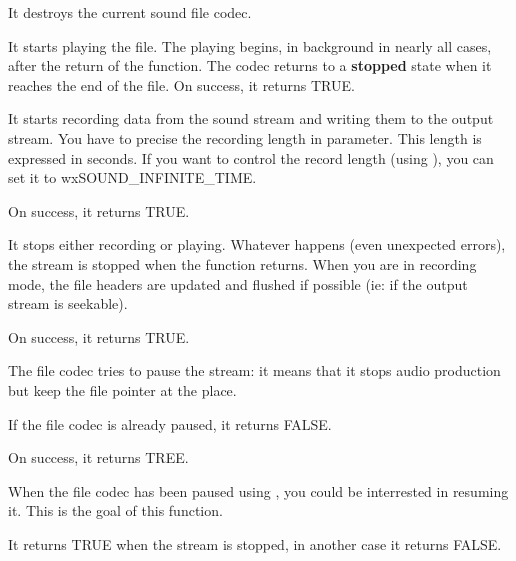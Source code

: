 It destroys the current sound file codec.

\label{wxsoundfilestreamplay}

It starts playing the file. The playing begins, in background
in nearly all cases, after the return of the function. The
codec returns to a {\bf stopped} state when it reaches the
end of the file.
On success, it returns TRUE.

\label{wxsoundfilestreamrecord}

It starts recording data from the sound stream and writing them
to the output stream. You have to precise the recording length in
parameter. This length is expressed in seconds. If you want to
control the record length (using ),
you can set it to wxSOUND\_INFINITE\_TIME.

On success, it returns TRUE.

\label{wxsoundfilestreamstop}

It stops either recording or playing. Whatever happens (even unexpected
errors), the stream is stopped when the function returns. When you are
in recording mode, the file headers are updated and flushed if possible
(ie: if the output stream is seekable).

On success, it returns TRUE.

\label{wxsoundfilestreampause}

The file codec tries to pause the stream: it means that it stops audio
production but keep the file pointer at the place.

If the file codec is already paused, it returns FALSE.

On success, it returns TREE.

\label{wxsoundfilestreamresume}

When the file codec has been paused using
, you could be interrested in
resuming it. This is the goal of this function.

\label{wxsoundfilestreamisstopped}

It returns TRUE when the stream is stopped, in another case it returns
FALSE.

